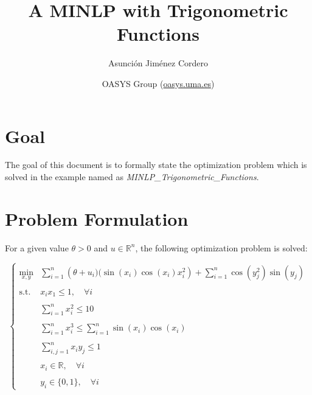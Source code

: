 \documentclass[a4paper,12pt]{article}
\begin{document}
\title{A MINLP with Trigonometric Functions}

\author{Asunci\'on Jim\'enez Cordero}

\date{\small{OASYS Group (\url{oasys.uma.es})}}

\maketitle

\section{Goal}

The goal of this document is to formally state the optimization problem which is solved in the example named as \emph{MINLP\_Trigonometric\_Functions}.

\section{Problem Formulation}

For a given value $\theta>0$ and $u\in\mathbb{R}^n$, the following optimization problem is solved:

\begin{equation}
  \left\{
  \begin{array}{cl}
  \min\limits_{x, y} & \sum\limits_{i = 1}^n \left(\theta + u_i)(\sin(x_i)\cos(x_i)x_i^2\right) + \sum\limits_{i = 1}^n \cos(y_j^2)\sin(y_j)\\
  &\\
   \text{s.t. }& x_ix_1\leq 1, \quad \forall i \\
   &\\
   & \sum\limits_{i = 1}^nx_i^2 \leq 10\\
   &\\
   & \sum\limits_{i = 1}^nx_i^3 \leq \sum\limits_{i = 1}^n \sin(x_i)\cos(x_i)\\
   &\\
   & \sum\limits_{i,j = 1}^n x_iy_j \leq 1\\
   &\\
   & x_i \in \mathbb{R}, \quad \forall i\\
   &\\
   & y_i\in\{0,1\}, \quad \forall i
  \end{array}
    \right.
  \end{equation}
\end{document}
